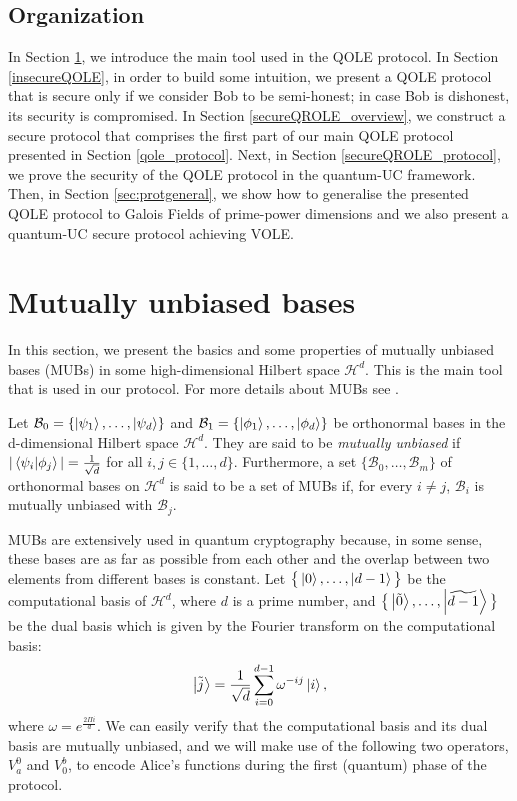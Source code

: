 \subsection{Organization}\label{Intro_organization}
In Section \ref{Prelim_MUB}, we introduce the main tool used in the QOLE protocol. In Section \ref{insecureQOLE}, in order to build some intuition, we present a QOLE protocol that is secure only if we consider Bob to be semi-honest; in case Bob is dishonest, its security is compromised. In Section \ref{secureQROLE_overview}, we construct a secure protocol that comprises the first part of our main QOLE protocol presented in Section \ref{qole_protocol}. Next, in Section \ref{secureQROLE_protocol}, we prove the security of the QOLE protocol in the quantum-UC framework. Then, in Section \ref{sec:protgeneral}, we show how to generalise the presented QOLE protocol to  Galois Fields of prime-power dimensions and we also present a quantum-UC secure protocol achieving VOLE.


\section{Mutually unbiased bases}\label{Prelim_MUB}

In this section, we present the basics and some properties of mutually unbiased bases (MUBs) in some high-dimensional Hilbert space $\mathcal{H}^d$. This is the main tool that is used in our protocol. For more details about MUBs see \cite{DEBZ10}.

\begin{definition}
Let $\mathcal{B}_0 = \{\ket{\psi_1}, \ldots, \ket{\psi_d}\}$ and $\mathcal{B}_1 = \{\ket{\phi_1}, \ldots, \ket{\phi_d}\}$ be orthonormal bases in the d-dimensional Hilbert space $\mathcal{H}^d$. They are said to be \textit{mutually unbiased} if $| \braket{\psi_i}{\phi_j} | = \frac{1}{\sqrt{d}}$ for all $i, j\in \{1,\ldots,d\}$. Furthermore, a set $\{\mathcal{B}_0, \ldots, \mathcal{B}_m\}$ of orthonormal bases on $\mathcal{H}^d$ is said to be a set of MUBs if, for every $i\neq j$, $\mathcal{B}_i$ is mutually unbiased with $\mathcal{B}_j$.
\end{definition}

MUBs are extensively used in quantum cryptography because, in some sense, these bases are as far as possible from each other and the overlap between two elements from different bases is constant. Let $\big\{\ket{0}, \ldots, \ket{d-1}\big\}$ be the computational basis of $\mathcal{H}^d$, where $d$ is a prime number, and $\big\{\ket{\tilde{0}}, \ldots, \ket{\widetilde{d-1}}\big\}$ be the dual basis which is given by the Fourier transform on the computational basis:
\begin{equation*}
    \ket{\tilde{j}} = \frac{1}{\sqrt{d}} \sum_{i=0}^{d-1} \omega^{-i j} \ket{i},\label{eq:dualbasis}
\end{equation*}
where $\omega = e^{\frac{2\Pi i}{d}}$. We can easily verify that the computational basis and its dual basis are mutually unbiased, and we will make use of the following two operators, $V^0_a$ and $V^b_0$, to encode Alice's functions during the first (quantum) phase of the protocol.

